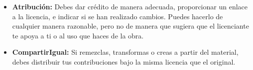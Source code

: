 \documentclass[12pt,a4paper]{article}
\begin{document}

\newpage
{} %

\thispagestyle{plain} %
\vspace*{\fill} %
\doclicenseThis                                                          %
\bigskip                                                                 %
\begin{itemize}                                                          %
    \item {\textbf{Atribución:} {Debes dar crédito de manera adecuada,   %
    proporcionar un enlace a la licencia, e indicar si se han            %
    realizado cambios. Puedes hacerlo de cualquier manera razonable,     %
    pero no de manera que sugiera que el licenciante te apoya a ti       %
    o al uso que haces de la obra.}}                                     %
    \item {\textbf{CompartirIgual:} {Si remezclas, transformas o         %
    creas a partir del material, debes distribuir tus contribuciones     %
    bajo la misma licencia que el original.}}                            %
\end{itemize}                                                            %
\end{document}
